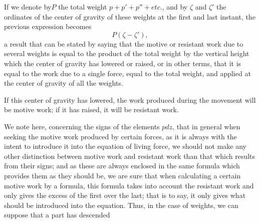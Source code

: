 \documentclass{book}
\begin{document}
If we denote by\(P\) the total weight \(p+p'+p'' + etc.\), and by \(\zeta\) and
\(\zeta'\) the ordinates of the center of gravity of these weights at the first and last instant, the previous expression becomes 
\[P(\zeta-\zeta'),\]
a result that can be stated by saying that the motive or resistant work due to several weights is equal to the product of the total weight by the vertical height which the center of gravity has lowered or raised, or in other terms, that it is equal to the work due to a single force, equal to the total weight, and applied at the center of gravity of all the weights.

If this center of gravity has lowered, the work produced during the movement will be motive work; if it has raised, it will be resistant work.


We note here, concerning the signs of the elements \(pdz\), that in general when seeking the motive work produced by certain forces, as it is always with the intent to introduce it into the equation of living force, we should not make any other distinction between motive work and resistant work than that which results from their signs; and as these are always enclosed in the same formula which provides them as they should be, we are sure that when calculating a certain motive work by a formula, this formula takes into account the resistant work and only gives the excess of the first over the last; that is to say, it only gives what should be introduced into the equation. Thus, in the case of weights, we can suppose that a part has descended
\newpage
\end{document}
